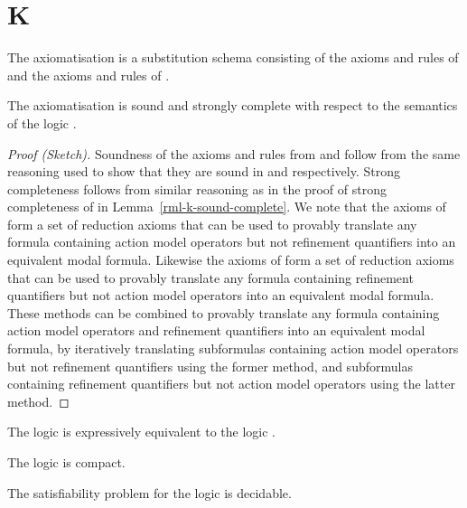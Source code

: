 \section{K}

\begin{definition}
The axiomatisation \axiomAamlK{} is a substitution schema consisting of the axioms and rules of \axiomAmlK{} and the axioms and rules of \axiomRmlK{}.
\end{definition}

\begin{theorem}\label{aaml-k-sound-complete}
The axiomatisation \axiomRmlK{} is sound and strongly complete with respect to the semantics of the logic \logicAamlK{}.
\end{theorem}

\begin{proof}[Proof (Sketch)]
Soundness of the axioms and rules from \axiomAmlK{} and \axiomRmlK{} follow from the same reasoning used to show that they are sound in \logicAmlK{} and \logicRmlK{} respectively.
Strong completeness follows from similar reasoning as in the proof of strong completeness of \axiomRmlK{} in Lemma~\ref{rml-k-sound-complete}.
We note that the axioms of \axiomAmlK{} form a set of reduction axioms that can be used to provably translate any formula containing action model operators but not refinement quantifiers into an equivalent modal formula.
Likewise the axioms of \axiomRmlK{} form a set of reduction axioms that can be used to provably translate any formula containing refinement quantifiers but not action model operators into an equivalent modal formula.
These methods can be combined to provably translate any formula containing action model operators and refinement quantifiers into an equivalent modal formula, by iteratively translating subformulas containing action model operators but not refinement quantifiers using the former method, and subformulas containing refinement quantifiers but not action model operators using the latter method.
\end{proof}

\begin{corollary}
The logic \logicAamlK{} is expressively equivalent to the logic \logicK{}.
\end{corollary}

\begin{corollary}
The logic \logicAamlK{} is compact.
\end{corollary}

\begin{corollary}
The satisfiability problem for the logic \logicAamlK{} is decidable.
\end{corollary}
